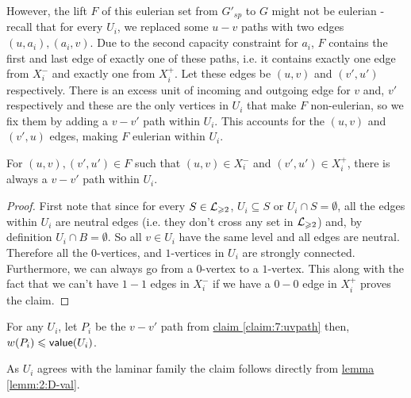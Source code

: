 \documentclass[./main.tex]{subfiles}
\begin{document}
		However, the lift $F$ of this eulerian set from $G'_{sp}$ to $G$ might not be eulerian - recall that for every $U_i$, we replaced some $u-v$ paths with two edges $(u,a_i),(a_i,v)$. 
		Due to the second capacity constraint for $a_i$, $F$ contains the first and last edge of exactly one of these paths, i.e. it contains exactly one edge from $X_i^-$ and exactly one from $X_i^+$. 
		Let these edges be $(u,v)$ and $(v',u')$ respectively. There is an excess unit of incoming and outgoing edge for $v$ and, $v'$ respectively and these are the only vertices in $U_i$ that make $F$ non-eulerian, so we fix them by adding a $v-v'$ path within $U_i$. This accounts for the $(u,v)$ and $(v',u
		)$ edges, making $F$ eulerian within $U_i$.\vspace{1mm}
		\begin{claim}
			For $(u,v),(v',u')\in F$ such that $(u,v)\in X^-_i$ and $(v',u')\in X^+_i$, there is always a $v-v'$ path within $U_i$.\label{claim:7:uvpath}
		\end{claim}
		\begin{proof}
			First note that since for every $S\in \mathcal{L}_{\geqslant 2}$, $U_i\subseteq S$ or $U_i\cap S = \emptyset$, all the edges within $U_i$ are neutral edges (i.e. they don't cross any set in $\mathcal{L}_{\geqslant 2}$) and, by definition $U_i \cap B = \emptyset$.
			So all $v \in U_i$ have the same level and all edges are neutral.
			Therefore all the $0$-vertices, and $1$-vertices in $U_i$ are strongly connected. Furthermore, we can always go from a $0$-vertex to a $1$-vertex. This along with the fact that we can't have $1-1$ edges in $X_i^-$ if we have a $0-0$ edge in $X_i^+$ proves the claim.
		\end{proof}
		
		\begin{claim}
			For any $U_i$, let $P_i$ be the $v - v'$ path from \hyperref[claim:7:uvpath]{claim \ref{claim:7:uvpath}} then, $w(P_i) \leqslant \textsf{\textup{value}}(U_i)$.
		\end{claim}
		As $U_i$ agrees with the laminar family the claim follows directly from \hyperref[lemm:2:D-val]{lemma \ref{lemm:2:D-val}}.\\
		
\end{document}
